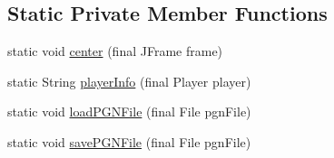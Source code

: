 \subsection*{Static Private Member Functions}
\begin{DoxyCompactItemize}
\item 
static void \mbox{\hyperlink{classcom_1_1chess_1_1gui_1_1_table_ae23ba8e7dc670c641e20662ee3d78971}{center}} (final J\+Frame frame)
\item 
static String \mbox{\hyperlink{classcom_1_1chess_1_1gui_1_1_table_a5fff03575473b6ff6f81a9d3e8db9501}{player\+Info}} (final Player player)
\item 
static void \mbox{\hyperlink{classcom_1_1chess_1_1gui_1_1_table_aafad3dcc4cb0a4ee8e2bca45637623e3}{load\+P\+G\+N\+File}} (final File pgn\+File)
\item 
static void \mbox{\hyperlink{classcom_1_1chess_1_1gui_1_1_table_aee8cc98f7a8190134f6ef9b51af6df8a}{save\+P\+G\+N\+File}} (final File pgn\+File)
\end{DoxyCompactItemize}
